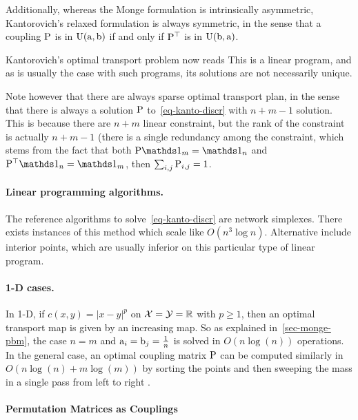%
Additionally, whereas the Monge formulation is intrinsically asymmetric, Kantorovich's relaxed formulation is always symmetric, in the sense that a coupling $\P$ is in  $\CouplingsD(\a,\b)$ if and only if  $\transp{\P}$ is in $\CouplingsD(\b,\a)$.

Kantorovich's optimal transport problem now reads
This is a linear program, and as is usually the case with such programs, its solutions are not necessarily unique. 

Note however that there are always sparse optimal transport plan, in the sense that there is always a solution $\P$ to~\eqref{eq-kanto-discr} with $n+m-1$ solution. This is because there are $n+m$ linear constraint, but the rank of the constraint is actually $n+m-1$ (there is a single redundancy among the constraint, which stems from the fact that both $\P\ones_m=\ones_n$ and $\P^\top \ones_n=\ones_m$, then $\sum_{i,j} \P_{i,j}=1$.


\paragraph{Linear programming algorithms.}

The reference algorithms to solve~\eqref{eq-kanto-discr} are network simplexes. There exists instances of this method which scale like  $O(n^3 \log n)$. Alternative include interior points, which are usually inferior on this particular type of linear program.

\paragraph{1-D cases.}

In 1-D, if $c(x,y)=|x-y|^p$ on $\Xx=\Yy=\RR$ with $p \geq 1$, then an optimal transport map is given by an increasing map. So as explained in~\eqref{sec-monge-pbm}, the case $n=m$ and $\a_i=\b_j=\frac{1}{n}$ is solved in $O(n \log(n))$ operations. 
%
In the general case, an optimal coupling matrix $\P$ can be computed similarly in $O(n\log(n)+m\log(m))$ by sorting the points and then sweeping the mass in a single pass from left to right .


\paragraph{Permutation Matrices as Couplings} 


